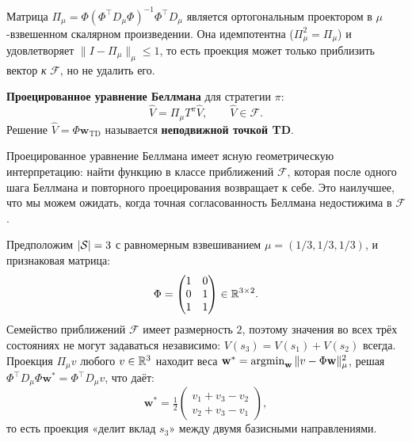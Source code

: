 Матрица $\Pi_\mu = \Phi(\Phi^\top D_\mu \Phi)^{-1}\Phi^\top D_\mu$ является ортогональным проектором в $\mu$-взвешенном скалярном произведении.  Она идемпотентна ($\Pi_\mu^2 = \Pi_\mu$) и удовлетворяет $\|I - \Pi_\mu\|_\mu \leq 1$, то есть проекция может только приблизить вектор \emph{к} $\mathcal{F}$, но не удалить его.

\begin{definition}
\label{def:projected-bellman}
\textbf{Проецированное уравнение Беллмана} для стратегии $\pi$:
\begin{equation}
\label{eq:projected-bellman}
\hat{V} = \Pi_\mu T^\pi \hat{V}, \qquad \hat{V} \in \mathcal{F}.
\end{equation}
Решение $\hat{V} = \Phi \mathbf{w}_{\mathrm{TD}}$ называется \textbf{неподвижной точкой TD}.
\end{definition}

Проецированное уравнение Беллмана имеет ясную геометрическую интерпретацию: найти функцию в классе приближений $\mathcal{F}$, которая после одного шага Беллмана и повторного проецирования возвращает к себе.  Это наилучшее, что мы можем ожидать, когда точная согласованность Беллмана недостижима в $\mathcal{F}$.

\begin{example}
\label{ex:three-state-projection}
Предположим $|\mathcal{S}| = 3$ с равномерным взвешиванием $\mu = (1/3, 1/3, 1/3)$, и признаковая матрица:
\[
\Phi = \begin{pmatrix} 1 & 0 \\ 0 & 1 \\ 1 & 1 \end{pmatrix} \in \mathbb{R}^{3 \times 2}.
\]
Семейство приближений $\mathcal{F}$ имеет размерность $2$, поэтому значения во всех трёх состояниях не могут задаваться независимо: $V(s_3) = V(s_1) + V(s_2)$ всегда.  Проекция $\Pi_\mu v$ любого $v \in \mathbb{R}^3$ находит веса $\mathbf{w}^* = \operatorname*{argmin}_\mathbf{w} \|v - \Phi \mathbf{w}\|_\mu^2$, решая $\Phi^\top D_\mu \Phi \mathbf{w}^* = \Phi^\top D_\mu v$, что даёт:
\[
\mathbf{w}^* = \tfrac{1}{2}\begin{pmatrix} v_1 + v_3 - v_2 \\ v_2 + v_3 - v_1 \end{pmatrix},
\]
то есть проекция «делит вклад $s_3$» между двумя базисными направлениями.
\end{example}

